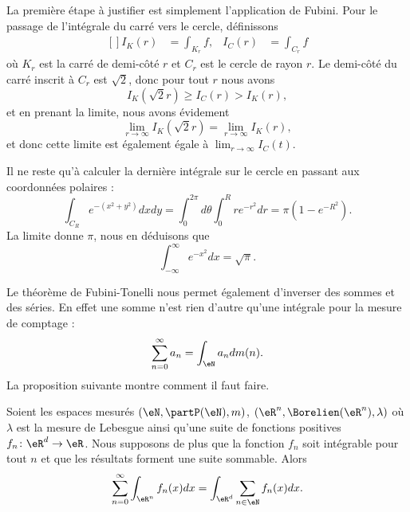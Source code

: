 \begin{example}
\begin{subproof}
		La première étape à justifier est simplement l'application de Fubini. Pour le passage de l'intégrale du carré vers le cercle, définissons
		\begin{equation}
			\begin{aligned}[]
				I_K(r) & =\int_{K_r}f, & I_C(r) & =\int_{C_r}f
			\end{aligned}
		\end{equation}
		où \( K_r\) est la carré de demi-côté \( r\) et \( C_r\) est le cercle de rayon \( r\). Le demi-côté du carré inscrit à \( C_r\) est \( \sqrt{2}\), donc pour tout \( r\) nous avons
		\begin{equation}
			I_K(\sqrt{2}r)\geq I_C(r)>I_K(r),
		\end{equation}
		et en prenant la limite, nous avons évidement
		\begin{equation}
			\lim_{r\to \infty}I_K(\sqrt{2}r)=\lim_{r\to\infty}I_K(r),
		\end{equation}
		et donc cette limite est également égale à \( \lim_{r\to\infty}I_C(t)\).

		Il ne reste qu'à calculer la dernière intégrale sur le cercle en passant aux coordonnées polaires :
		\begin{equation}
			\int_{C_R} e^{-(x^2+y^2)}dxdy=\int_0^{2\pi}d\theta\int_0^Rr e^{-r^2}dr=\pi(1- e^{-R^2}).
		\end{equation}
		La limite donne \( \pi\), nous en déduisons que
		\begin{equation}    \label{EqFDvHTg}
			\int_{-\infty}^{\infty} e^{-x^2}dx=\sqrt{\pi}.
		\end{equation}
	\end{subproof}

\end{example}

Le théorème de Fubini-Tonelli nous permet également d'inverser des sommes et des séries. En effet une somme n'est rien d'autre qu'une intégrale pour la mesure de comptage :
\begin{equation}
	\sum_{n=0}^{\infty}a_n=\int_{\eN}a_ndm(n).
\end{equation}
La proposition suivante montre comment il faut faire.

\begin{proposition}\label{PropInversSumIntFub}
	Soient les espaces mesurés \( (\eN,\partP(\eN),m)\), \( (\eR^n,\Borelien(\eR^n),\lambda)\) où \( \lambda\) est la mesure de Lebesgue ainsi qu'une suite de fonctions positives \( f_n\colon \eR^d\to \eR\). Nous supposons de plus que la fonction \( f_n\) soit intégrable pour tout \( n\) et que les résultats forment une suite sommable. Alors
	\begin{equation}
		\sum_{n=0}^{\infty}\int_{\eR^n}f_n(x)dx=\int_{\eR^d}\sum_{n\in \eN}f_n(x)dx.
	\end{equation}
\end{proposition}

